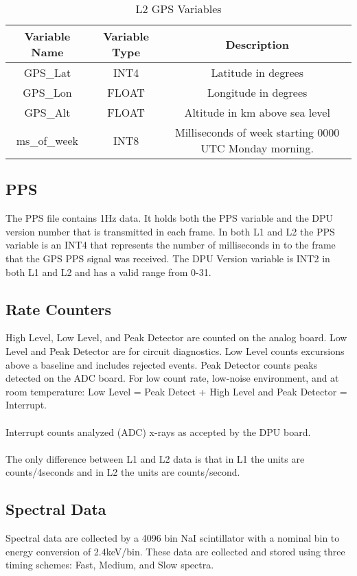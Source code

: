 \documentclass{article}
\begin{document}
\begin{table}[H]
\caption{L2 GPS Variables}
\begin{tabular}{|c|c|c|}
\hline
Variable Name&Variable Type&Description\\ \hline
GPS\_Lat&INT4&Latitude in degrees\\
GPS\_Lon&FLOAT&Longitude in degrees\\
GPS\_Alt&FLOAT&Altitude in km above sea level\\
ms\_of\_week&INT8 & Milliseconds of week starting 0000 UTC Monday morning.\\
\hline
\end{tabular}
\end{table}

\subsection{PPS}
The PPS file contains 1Hz data. It holds both the PPS variable and the DPU version number that is transmitted in each frame. In both L1 and L2 the PPS variable is an INT4 that represents the number of milliseconds in to the frame that the GPS PPS signal was received. The DPU Version variable is INT2 in both L1 and L2 and has a valid range from 0-31.

\subsection{Rate Counters}
High Level, Low Level, and Peak Detector are counted on the analog board. Low Level and Peak Detector are for circuit diagnostics. Low Level counts excursions above a baseline and includes rejected events. Peak Detector counts peaks detected on the ADC board. For low count rate, low-noise environment, and at room temperature: Low Level = Peak Detect + High Level and Peak Detector = Interrupt.\\\\
Interrupt counts analyzed (ADC) x-rays as accepted by the DPU board.\\\\
The only difference between L1 and L2 data is that in L1 the units are counts/4seconds and in L2 the units are counts/second.

\subsection{Spectral Data}
Spectral data are collected by a 4096 bin NaI scintillator with a nominal bin to energy conversion of 2.4keV/bin. These data are collected and stored using three timing schemes: Fast, Medium, and Slow spectra.
\end{document}
